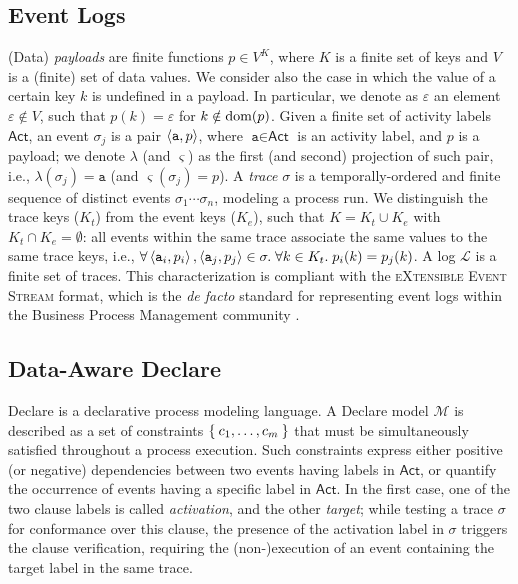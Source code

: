 \subsection{Event Logs}
(Data) \textit{payloads} are finite functions $p\in V^K$, where $K$ is a finite set of keys and $V$ is a (finite) set of data values. We consider also the case in which the value of a certain key $k$ is undefined in a payload. In particular, we denote as $\varepsilon$ an element $\varepsilon\notin V$, such that $p(k)=\varepsilon$ for $k\notin\textup{dom}(p)$. Given a finite set of activity labels $\textsf{Act}$, an event $\sigma_j$ is a pair $\Braket{\texttt{a},p}$, where $\texttt{a}\in\textsf{Act}$ is an activity label, and $p$ is a payload; we denote $\lambda$ (and $\varsigma$) as the first (and second) projection of such pair, i.e., $\lambda(\sigma_j)=\texttt{a}$ (and $\varsigma(\sigma_j)=p$). A \textit{trace} $\sigma$ is a temporally-ordered and finite sequence of distinct events $\sigma_1\cdots\sigma_n$, modeling a process run. We distinguish the trace keys ($K_t$) from the event keys ($K_e$), such that $K=K_t\cup K_e$ with $K_t\cap K_e=\emptyset$: all events within the same trace associate the same values to the same trace keys, i.e., $\forall \Braket{\texttt{a}_i,p_i},\Braket{\texttt{a}_j,p_j}\in\sigma.\;\forall k\in K_t.\; p_i(k)=p_j(k)$. A log $\mathcal{L}$ is a finite set of traces. This  characterization is compliant with the \textsc{eXtensible Event Stream} format, which is the \textit{de facto} standard for representing event logs within the Business Process Management community \cite{}.


\subsection{Data-Aware Declare}\label{ssec:dad}
Declare is a declarative process modeling language. A Declare model $\mathcal{M}$ is described as a set of constraints $\Set{c_1,\dots,c_m}$ that must be simultaneously satisfied throughout a process execution.
Such constraints express either positive (or negative) dependencies between two events having labels in $\textsf{Act}$, or quantify the occurrence of events having a specific label in $\textsf{Act}$. In the first case, one of the two clause labels is called \textit{activation}, and the other \textit{target}; while testing a trace $\sigma$ for conformance over this clause, the presence of the activation label in $\sigma$ triggers the clause verification, requiring the (non-)execution of an event containing the target label in the same trace.

